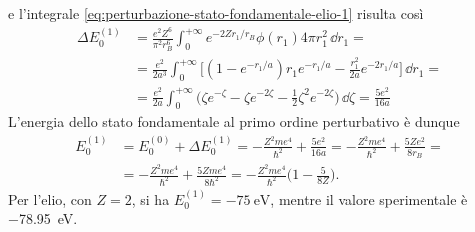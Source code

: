 e l'integrale \eqref{eq:perturbazione-stato-fondamentale-elio-1} risulta cos\`i
\begin{equation}
    \begin{split}
        \Delta E_0^{(1)}
        &=\frac{e^2Z^6}{\pi^2 r_B^6}\int_0^{+\infty}e^{-2Zr_1/r_B}\phi(r_1)4\pi r_1^2\,\dd r_1=\\
        &=\frac{e^2}{2a^3}\int_0^{+\infty}\biggl[(1-e^{-r_1/a})r_1e^{-r_1/a}-\frac{r_1^2}{2a}e^{-2r_1/a}\biggr]\,\dd r_1=\\
        &=\frac{e^2}{2a}\int_0^{+\infty}\biggl(\zeta e^{-\zeta}-\zeta e^{-2\zeta}-\frac12\zeta^2e^{-2\zeta}\biggr)\,\dd\zeta=\frac{5e^2}{16a}
    \end{split}
    \label{eq:perturbazione-stato-fondamentale-elio-2}
\end{equation}
L'energia dello stato fondamentale al primo ordine perturbativo è dunque
\begin{equation}
    \begin{split}
        E_0^{(1)}&=
        E_0^{(0)}+\Delta E_0^{(1)}=
        -\frac{Z^2me^4}{\hbar^2}+\frac{5e^2}{16a}=
        -\frac{Z^2me^4}{\hbar^2}+\frac{5Ze^2}{8r_B}=\\&=
        -\frac{Z^2me^4}{\hbar^2}+\frac{5Zme^4}{8\hbar^2}=
        -\frac{Z^2me^4}{\hbar^2}\bigg(1-\frac{5}{8Z}\bigg).
    \end{split}
    \label{eq:energia-elio-perturbazione}
\end{equation}
Per l'elio, con $Z=2$, si ha $E_0^{(1)}=\SI{-75}{\electronvolt}$, mentre il valore sperimentale è \SI{-78.95}{\electronvolt}.

